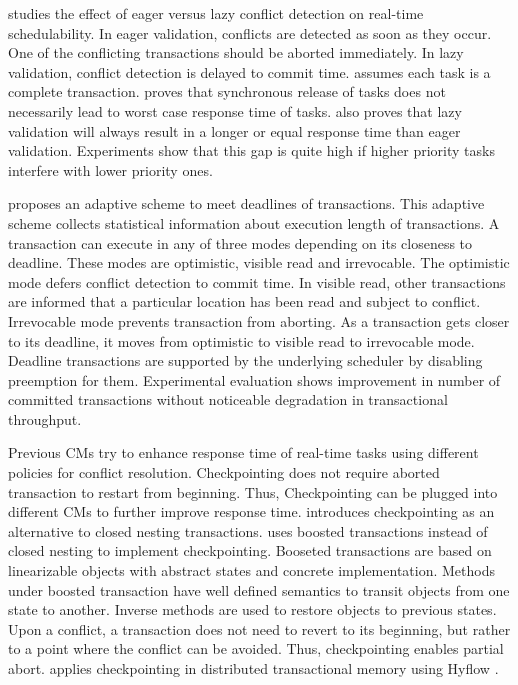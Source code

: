\cite{5665752} studies the effect of eager versus lazy conflict detection
on real-time schedulability. In eager validation, conflicts are detected
as soon as they occur. One of the conflicting transactions should
be aborted immediately. In lazy validation, conflict detection is
delayed to commit time. \cite{5665752} assumes each task is a complete
transaction. \cite{5665752} proves that synchronous release of tasks
does not necessarily lead to worst case response time of tasks. \cite{5665752}
also proves that lazy validation will always result in a longer or
equal response time than eager validation. Experiments show that this
gap is quite high if higher priority tasks interfere with lower priority
ones.

\cite{5958224}proposes an adaptive scheme to meet deadlines of transactions.
This adaptive scheme collects statistical information about execution
length of transactions. A transaction can execute in any of three
modes depending on its closeness to deadline. These modes are optimistic,
visible read and irrevocable. The optimistic mode defers conflict
detection to commit time. In visible read, other transactions are
informed that a particular location has been read and subject to conflict.
Irrevocable mode prevents transaction from aborting. As a transaction
gets closer to its deadline, it moves from optimistic to visible read
to irrevocable mode. Deadline transactions are supported by the underlying
scheduler by disabling preemption for them. Experimental evaluation
shows improvement in number of committed transactions without noticeable
degradation in transactional throughput.

Previous CMs try to enhance response time of real-time tasks using different policies for conflict resolution. Checkpointing does not require aborted transaction to restart from beginning. Thus, Checkpointing can be plugged into different CMs to further improve response time. \cite{Koskinen:2008:CCI:1378533.1378563} introduces checkpointing as an alternative to closed nesting transactions\cite{turcu2012closed}. \cite{Koskinen:2008:CCI:1378533.1378563} uses boosted transactions \cite{Herlihy:2008:TBM:1345206.1345237} instead of closed nesting \cite{Peri:2011:CCE:1946143.1946152,turcu2012closed,6267834} to implement checkpointing. Booseted transactions are based on linearizable objects with abstract states and concrete implementation. Methods under boosted transaction have well defined semantics to transit objects from one state to another. Inverse methods are used to restore objects to previous states. Upon a conflict, a transaction does not need to revert to its beginning, but rather to a point where the conflict can be avoided. Thus, checkpointing enables partial abort. \cite{turcu_phd_proposal} applies checkpointing in distributed transactional memory using Hyflow \cite{Saad:2011:HHP:1996130.1996167}.